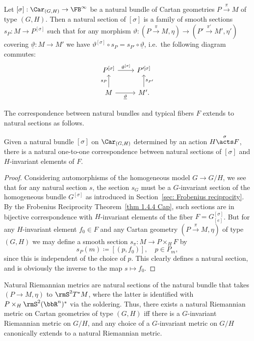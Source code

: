 \begin{defn}
    Let $[\sigma]:\Car_{(G,H)}\to \FB^\infty$ be a natural bundle of Cartan geometries $P\overset{\pi}{\to}M$ of type $(G,H)$. Then a natural section of $[\sigma]$ is a family of smooth sections $s_{P}:M\to P^{[\sigma]}$ such that for any morphism $\vartheta:(P\overset{\pi}{\to} M,\eta)\to (P'\overset{\pi'}{\to} M',\eta')$ covering $\underline{\vartheta}:M\to M'$ we have $\vartheta^{[\sigma]}\circ s_P=s_{P'}\circ \underline{\vartheta}$, i.e.\ the following diagram commutes:
    \[
    \begin{tikzcd}
        P^{[\sigma]}\arrow[r,"\vartheta^{[\sigma]}"] & P^{\prime[\sigma]}\\
        M\arrow[u,"s_P"]\arrow[r,swap,"\underline{\vartheta}"]& M'.\arrow[u,swap,"s_{P'}"]
    \end{tikzcd}
    \]
\end{defn}

The correspondence between natural bundles and typical fibers $F$ extends to natural sections as follows.

\begin{prop}\label{prop natural sections}
    Given a natural bundle $[\sigma]$ on $\Car_{(G,H)}$ determined by an action $H\overset{\sigma}{\acts}F$, there is a natural one-to-one correspondence between natural sections of $[\sigma]$ and $H$-invariant elements of $F$.
\end{prop}
\begin{proof}
    Considering automorphisms of the homogeneous model $G\to G\slash H$, we see that for any natural section $s$, the section $s_G$ must be a $G$-invariant section of the homogeneous bundle $G^{[\sigma]}$ as introduced in Section~\ref{sec: Frobenius reciprocity}. By the Frobenius Reciprocity Theorem~\ref{thm 1.4.4 Cap}, such sections are in bijective correspondence with $H$-invariant elements of the fiber $F=G^{[\sigma]}_{[e]}$.
    But for any $H$-invariant element $f_0\in F$ and any Cartan geometry $(P\overset{\pi}{\to}M,\eta)$ of type $(G,H)$ we may define a smooth section $s_\pi:M\to P\times_H F$ by 
    \[s_P(m)\coloneqq [(p,f_0)],\quad p\in P_m,\]
    since this is independent of the choice of $p$.  This clearly defines a natural section, and is obviously the inverse to the map $s\mapsto f_0$.
\end{proof}

\begin{example}
    Natural Riemannian metrics are natural sections of the natural bundle that takes $(P\to M,\eta)$ to $\rmS^2 T^\ast M$, where the latter is identified with $P\times_H \rmS^2(\bbR^n)^\ast$ via the soldering. Thus, there exists a natural Riemannian metric on Cartan geometries of type $(G,H)$ iff there is a $G$-invariant Riemannian metric on $G\slash H$, and any choice of a $G$-invariant metric on $G\slash H$ canonically extends to a natural Riemannian metric.
\end{example}


